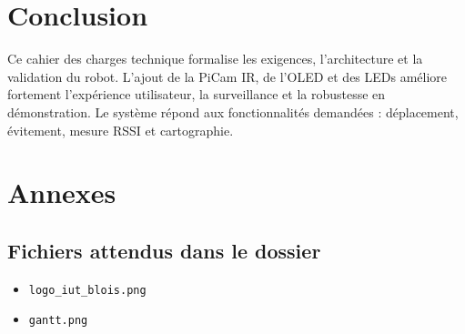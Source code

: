 \documentclass[a4paper,12pt]{report}
\begin{document}
\chapter{Conclusion}

Ce cahier des charges technique formalise les exigences, l’architecture et la validation du robot.
L’ajout de la PiCam IR, de l’OLED et des LEDs améliore fortement l’expérience utilisateur, la surveillance et la robustesse en démonstration.
Le système répond aux fonctionnalités demandées : déplacement, évitement, mesure RSSI et cartographie.

\appendix
\chapter{Annexes}

\section{Fichiers attendus dans le dossier}
\begin{itemize}
    \item \texttt{logo\_iut\_blois.png}
    \item \texttt{gantt.png}
\end{itemize}
\end{document}
